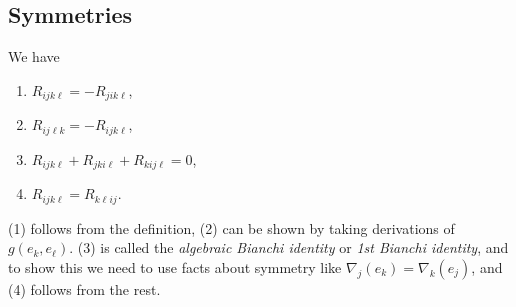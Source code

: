 \subsection{Symmetries}
We have
\begin{enumerate}[label=(\arabic*)]
    \item $R_{ijk\ell}=-R_{jik\ell}$,
    \item $R_{ij\ell k}=-R_{ijk\ell}$,
    \item $R_{ijk\ell}+R_{jki\ell}+R_{kij\ell}=0$,
    \item $R_{ijk\ell}=R_{k\ell ij}$.
\end{enumerate}
(1) follows from the definition, (2) can be shown by taking derivations of $g(e_k,e_{\ell})$. (3) is called the \emph{algebraic Bianchi identity} or \emph{1st Bianchi identity}, and to show this we need to use facts about symmetry like $\nabla_j (e_k)=\nabla_k(e_j )$, and (4) follows from the rest.

